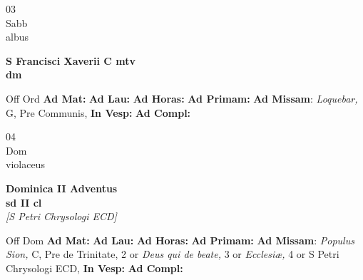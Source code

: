 \documentclass[10pt, openany]{book}
\begin{document}
    \begin{center}
        \begin{minipage}{3.5in}
            \vspace{2em}
            \begin{minipage}{0.5in}
                {\Huge 03} \\
                {\normalsize Sabb} \\
                {\normalsize albus}
            \end{minipage}
            \begin{minipage}{3.0in}
                \textbf{ \large S Francisci Xaverii C mtv \\
                \textnormal{\normalsize dm}} \\ 
            \end{minipage}
            \begin{justify}Off Ord
                \textbf{Ad Mat: }
                \textbf{Ad Lau: }
                \textbf{Ad Horas: }
                \textbf{Ad Primam: }\textbf{Ad Missam}: \textit{Loquebar,} G, Pre Communis,  
                \textbf{In Vesp: }
                \textbf{Ad Compl: }
            \end{justify}
        \end{minipage}
    \end{center}

    \begin{center}
        \begin{minipage}{3.5in}
            \vspace{2em}
            \begin{minipage}{0.5in}
                {\Huge 04} \\
                {\normalsize Dom} \\
                {\normalsize violaceus}
            \end{minipage}
            \begin{minipage}{3.0in}
                \textbf{ \large Dominica II Adventus \\
                \textnormal{\normalsize sd II cl}} \\ \textit{[S Petri Chrysologi ECD]} \\ 
            \end{minipage}
            \begin{justify}Off Dom
                \textbf{Ad Mat: }
                \textbf{Ad Lau: }
                \textbf{Ad Horas: }
                \textbf{Ad Primam: }\textbf{Ad Missam}: \textit{Populus Sion,} C, Pre de Trinitate, 2 or \textit{Deus qui de beate,} 3 or \textit{Ecclesiæ,} 4 or S Petri Chrysologi ECD,  
                \textbf{In Vesp: }
                \textbf{Ad Compl: }
            \end{justify}
        \end{minipage}
    \end{center}
\end{document}
